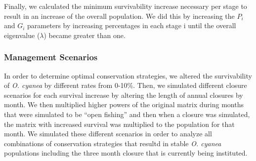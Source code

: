 \documentclass[
]{article}
\begin{document}
Finally, we calculated the minimum survivability increase necessary per stage to result in an increase of the overall population. We did this by increasing the \(P_i\) and \(G_i\) parameters by increasing percentages in each stage i until the overall eigenvalue (\(\lambda\)) became greater than one.

\hypertarget{management-scenarios}{%
\subsubsection{Management Scenarios}\label{management-scenarios}}

In order to determine optimal conservation strategies, we altered the survivability of \emph{O. cyanea} by different rates from 0-10\%. Then, we simulated different closure scenarios for each survival increase by altering the length of annual closures by month. We then multiplied higher powers of the original matrix during months that were simulated to be ``open fishing'' and then when a closure was simulated, the matrix with increased survival was multiplied to the population for that month. We simulated these different scenarios in order to analyze all combinations of conservation strategies that resultd in stable \emph{O. cyanea} populations including the three month closure that is currently being instituted.

\begin{table}

\caption{\label{tab:LifeHistory}Existing research and information on the per-stage duration of \emph{O. cyanea}. All existing estimates are from Heukelem (1976), Guard \& Mgaya (2003), Humber et al. (2006), Aina (2009). Note: Heukelem and Fred (1976) estimate the time to maturity to be 10-13 months (i.e.~stages 1-3 combined). \label{LifeHistory}}
\centering
{}
\end{table}
\end{document}

